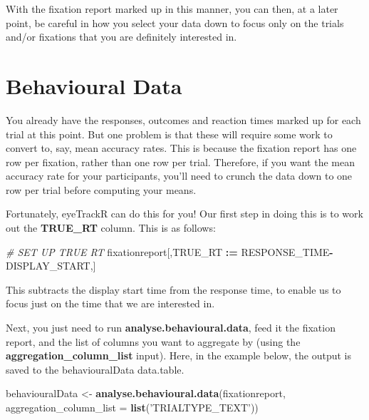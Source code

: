 \documentclass[]{book}
\newenvironment{Shaded}{\begin{snugshade}}{\end{snugshade}}
\newcommand{\CommentTok}[1]{\textcolor[rgb]{0.56,0.35,0.01}{\textit{#1}}}
\newcommand{\DataTypeTok}[1]{\textcolor[rgb]{0.13,0.29,0.53}{#1}}
\newcommand{\ErrorTok}[1]{\textcolor[rgb]{0.64,0.00,0.00}{\textbf{#1}}}
\newcommand{\KeywordTok}[1]{\textcolor[rgb]{0.13,0.29,0.53}{\textbf{#1}}}
\newcommand{\NormalTok}[1]{#1}
\newcommand{\OperatorTok}[1]{\textcolor[rgb]{0.81,0.36,0.00}{\textbf{#1}}}
\newcommand{\StringTok}[1]{\textcolor[rgb]{0.31,0.60,0.02}{#1}}
\begin{document}
With the fixation report marked up in this manner, you can then, at a later point, be careful in how you select your data down to focus only on the trials and/or fixations that you are definitely interested in.

\hypertarget{behavioural-data}{%
\section{Behavioural Data}\label{behavioural-data}}

You already have the responses, outcomes and reaction times marked up for each trial at this point. But one problem is that these will require some work to convert to, say, mean accuracy rates. This is because the fixation report has one row per fixation, rather than one row per trial. Therefore, if you want the mean accuracy rate for your participants, you'll need to crunch the data down to one row per trial before computing your means.

Fortunately, eyeTrackR can do this for you! Our first step in doing this is to work out the \textbf{TRUE\_RT} column. This is as follows:

\begin{Shaded}
\begin{Highlighting}[]
\CommentTok{# SET UP TRUE RT}
\NormalTok{fixationreport[,TRUE_RT }\OperatorTok{:}\ErrorTok{=}\StringTok{ }\NormalTok{RESPONSE_TIME}\OperatorTok{-}\NormalTok{DISPLAY_START,]}
\end{Highlighting}
\end{Shaded}

This subtracts the display start time from the response time, to enable us to focus just on the time that we are interested in.

Next, you just need to run \textbf{analyse.behavioural.data}, feed it the fixation report, and the list of columns you want to aggregate by (using the \textbf{aggregation\_column\_list} input). Here, in the example below, the output is saved to the behaviouralData data.table.

\begin{Shaded}
\begin{Highlighting}[]
\NormalTok{behaviouralData <-}\StringTok{ }\KeywordTok{analyse.behavioural.data}\NormalTok{(fixationreport, }
                                                \DataTypeTok{aggregation_column_list =} \KeywordTok{list}\NormalTok{(}\StringTok{'TRIALTYPE_TEXT'}\NormalTok{))}
\end{Highlighting}
\end{Shaded}
\end{document}
